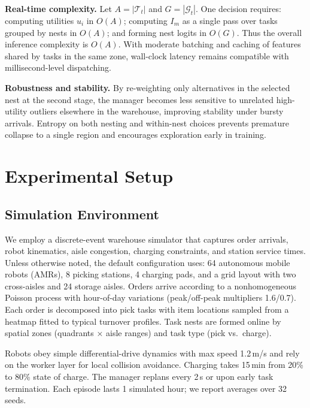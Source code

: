 \documentclass[journal,onecolumn]{IEEEtran}
\begin{document}
\textbf{Real-time complexity.} Let \(A=|\mathcal{T}_t|\) and \(G=|\mathcal{G}_t|\). One decision requires: computing utilities \(u_i\) in \(O(A)\); computing \(I_m\) as a single pass over tasks grouped by nests in \(O(A)\); and forming nest logits in \(O(G)\). Thus the overall inference complexity is \(O(A)\). With moderate batching and caching of features shared by tasks in the same zone, wall-clock latency remains compatible with millisecond-level dispatching.

\textbf{Robustness and stability.} By re-weighting only alternatives in the selected nest at the second stage, the manager becomes less sensitive to unrelated high-utility outliers elsewhere in the warehouse, improving stability under bursty arrivals. Entropy on both nesting and within-nest choices prevents premature collapse to a single region and encourages exploration early in training.

\section{Experimental Setup}

\subsection{Simulation Environment}
We employ a discrete-event warehouse simulator that captures order arrivals, robot kinematics, aisle congestion, charging constraints, and station service times. Unless otherwise noted, the default configuration uses: 64 autonomous mobile robots (AMRs), 8 picking stations, 4 charging pads, and a grid layout with two cross-aisles and 24 storage aisles. Orders arrive according to a nonhomogeneous Poisson process with hour-of-day variations (peak/off-peak multipliers 1.6/0.7). Each order is decomposed into pick tasks with item locations sampled from a heatmap fitted to typical turnover profiles. Task nests are formed online by spatial zones (quadrants × aisle ranges) and task type (pick vs.\ charge).

Robots obey simple differential-drive dynamics with max speed 1.2\,m/s and rely on the worker layer for local collision avoidance. Charging takes 15\,min from 20\% to 80\% state of charge. The manager replans every 2\,s or upon early task termination. Each episode lasts 1 simulated hour; we report averages over 32 seeds.
\end{document}

